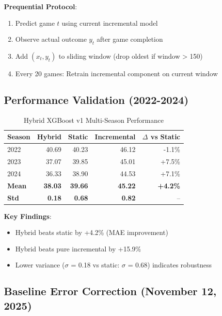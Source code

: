 \textbf{Prequential Protocol}:
\begin{enumerate}
\item Predict game $t$ using current incremental model
\item Observe actual outcome $y_t$ after game completion
\item Add $(x_t, y_t)$ to sliding window (drop oldest if window > 150)
\item Every 20 games: Retrain incremental component on current window
\end{enumerate}

\subsection{Performance Validation (2022-2024)}

\begin{table}[htbp]
\centering
\caption{Hybrid XGBoost v1 Multi-Season Performance}
\label{tab:hybrid-performance}
\begin{tabular}{lrrrr}
\toprule
\textbf{Season} & \textbf{Hybrid} & \textbf{Static} & \textbf{Incremental} & \textbf{$\Delta$ vs Static} \\
\midrule
2022 & 40.69 & 40.23 & 46.12 & -1.1\% \\
2023 & 37.07 & 39.85 & 45.01 & +7.5\% \\
2024 & 36.33 & 38.90 & 44.53 & +7.1\% \\
\midrule
\textbf{Mean} & \textbf{38.03} & \textbf{39.66} & \textbf{45.22} & \textbf{+4.2\%} \\
\textbf{Std} & \textbf{0.18} & \textbf{0.68} & \textbf{0.82} & -- \\
\bottomrule
\end{tabular}
\end{table}

\textbf{Key Findings}:
\begin{itemize}
\item Hybrid beats static by +4.2\% (MAE improvement)
\item Hybrid beats pure incremental by +15.9\%
\item Lower variance ($\sigma$ = 0.18 vs static: $\sigma$ = 0.68) indicates robustness
\end{itemize}

\subsection{Baseline Error Correction (November 12, 2025)}

